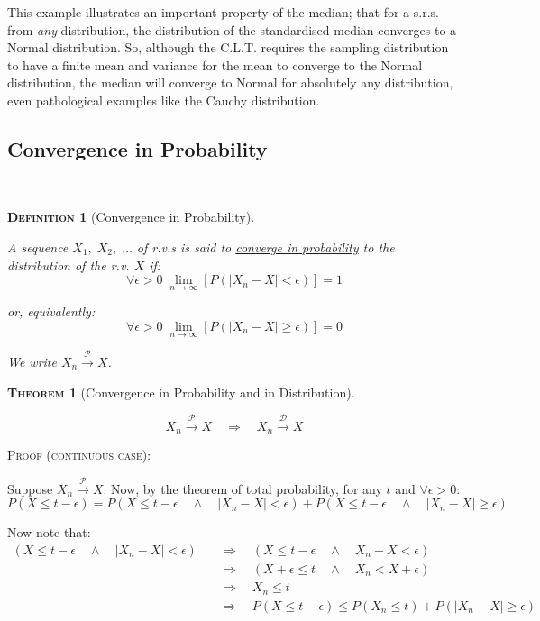 \documentclass[12pt,a4paper]{article}
\newtheorem{definition}{\textsc{Definition}}[section]
\newtheorem{theorem}{\textsc{Theorem}}[section]
\newcommand{\AND}{\quad\wedge\quad}
\newcommand{\imply}{\quad\Rightarrow\quad}
\begin{document}
This example illustrates an important property of the median; that for a s.r.s. from \emph{any} distribution, the distribution of the standardised median converges to a Normal distribution. So, although the C.L.T. requires the sampling distribution to have a finite mean and variance for the mean to converge to the Normal distribution, the median will converge to Normal for absolutely any distribution, even pathological examples like the Cauchy distribution.

\subsection{Convergence in Probability}$\;$

\begin{definition}[Convergence in Probability]$\;$\par\vspace{1cm}

A sequence $X_1,\;X_2,\;\hdots$ of r.v.s is said to \underline{converge in probability} to the distribution of the r.v. $X$ if:
$$\forall\epsilon>0\;\lim_{n\to\infty} \left[P\left(\left|X_n-X\right|<\epsilon\right)\right] = 1$$

or, equivalently:
$$\forall\epsilon >0\;\lim_{n\to\infty}\left[P\left(\left|X_n-X\right|\geq\epsilon\right)\right] = 0$$

We write $X_n \xrightarrow{\mathscr{P}} X$.

\end{definition}

\begin{theorem}[Convergence in Probability and in Distribution]$\;$\par\vspace{1cm}

$$X_n\xrightarrow{\mathscr{P}} X \quad\Rightarrow\quad X_n\xrightarrow{\mathscr{D}} X$$

\end{theorem}

\noindent\textsc{Proof (continuous case):}\par\vspace{1cm}

Suppose $X_n \xrightarrow{\mathscr{P}}X$. Now, by the theorem of total probability, for any $t$ and $\forall \epsilon>0$:
$$P(X\leq t-\epsilon) = P(X\leq t-\epsilon \AND \left|X_n-X\right| < \epsilon) + P(X\leq t-\epsilon \AND\left|X_n-X\right| \geq \epsilon)$$

Now note that:
\begin{align*}
(X\leq t-\epsilon \AND \left|X_n-X\right| < \epsilon) &\imply (X\leq t-\epsilon \AND X_n-X<\epsilon)\\
&\imply (X+\epsilon\leq t \AND X_n < X + \epsilon)\\
&\imply X_n\leq t\\
&\imply P(X\leq t-\epsilon)\leq P(X_n\leq t) + P(\left|X_n-X\right|\geq \epsilon)
\end{align*}
\end{document}
